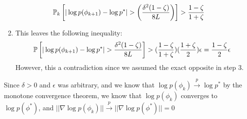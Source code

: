 \begin{enumerate}
\begin{align*}
        \mathbb{P}_k\left[|\log p(\phi_{k+1}) - \log p^*| >  \left(\frac{\delta^2(1-\zeta)}{8L}\right) \right] &> \frac{1-\zeta}{1+\zeta}
    \end{align*}
    \item This leaves the following inequality:
    \begin{equation}
        \mathbb{P}\left[|\log p(\phi_{k+1}) - \log p^*| > \frac{\delta^2(1-\zeta)}{8L} \right] > (\frac{1-\zeta}{1+\zeta})(\frac{1+\zeta}{2})\epsilon = \frac{1-\zeta}{2} \epsilon \label{eqn:eps_2}
    \end{equation}
    However, this a contradiction since we assumed the exact opposite in step 3.
\end{enumerate}

Since $\delta > 0$ and $\epsilon$ was arbitrary, and we know that $\log p(\phi_k) \overset{p}{\to} \log p^*$ by the monotone convergence theorem, we know that $\log p(\phi_k)$ converges to $\log p(\phi^*)$, and $||\nabla \log p(\phi_k)|| \overset{p}{\to}||\nabla \log p(\phi^*)|| = 0$